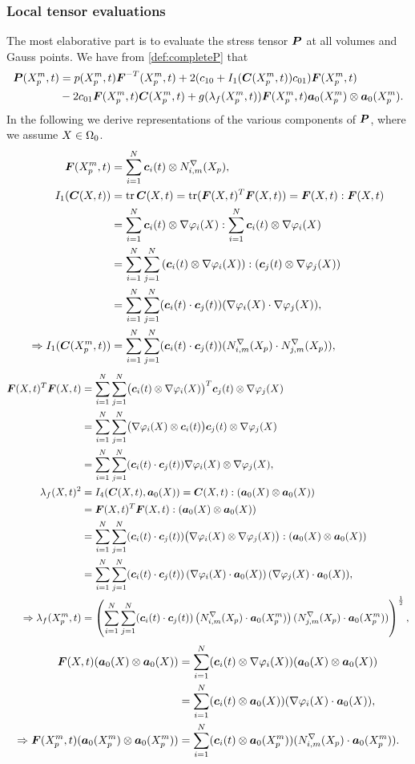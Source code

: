 \subsubsection{Local tensor evaluations}
The most elaborative part is to evaluate the stress tensor $\vP$ at all volumes and Gauss points.
We have from \eqref{def:completeP} that
\begin{align*}
		\vP(\pmp,t) &= p(\pmp,t)\vF^{-T}(\pmp,t) + 2(c_{10} + I_1(\vC(\pmp,t))c_{01})\vF(\pmp,t)\\
			 &- 2c_{01}\vF(\pmp,t)\vC(\pmp,t)+g(\lambda_f(\pmp,t))\vF(\pmp,t)\va_0(\pmp)\otimes\va_0(\pmp).
\end{align*}
In the following we derive representations of the various components of $\vP$, where we assume $X\in\Or$.
\begin{align*}
	\vF(\pmp,t) &= \sumi \vc_i(t)\otimes \dNimp,\\
	I_1(\vC(X,t)) &= \tr\vC(X,t) = \tr(\vF(X,t)^T\vF(X,t)) = \vF(X,t) : \vF(X,t)\\
	&= \sumi \vc_i(t)\otimes \dpi : \sumi \vc_i(t)\otimes \dpi\\
	&= \sumi\sumj \left(\vc_i(t)\otimes \dpi\right) : (\vc_j(t)\otimes \dpj)\\
	&= \sumi\sumj (\vc_i(t) \cdot \vc_j(t))(\dpi \cdot \dpj),\\
	\Rightarrow I_1(\vC(\pmp,t)) &= \sumi\sumj (\vc_i(t) \cdot \vc_j(t))(\dNimp \cdot \dNjmp),\\
\end{align*}
\begin{align*}
	\vF(X,t)^T\vF(X,t) &= \sumi\sumj \bigl(\vc_i(t)\otimes\dpi\bigr)^T\vc_j(t)\otimes\dpj\\
	 &= \sumi\sumj \bigl(\dpi\otimes\vc_i(t)\bigr)\vc_j(t)\otimes\dpj\\
	 &=\sumi\sumj (\vc_i(t)\cdot \vc_j(t))\dpi\otimes\dpj,\\
	\lambda_f(X,t)^2 &=I_4(\vC(X,t),\va_0(X)) = \vC(X,t):(\va_0(X)\otimes \va_0(X))\\
			&=  \vF(X,t)^T\vF(X,t) : (\va_0(X)\otimes \va_0(X))\\
			&=  \sumi\sumj (\vc_i(t)\cdot \vc_j(t))\bigl(\dpi\otimes\dpj\bigr) : (\va_0(X)\otimes \va_0(X))\\
			&=  \sumi\sumj (\vc_i(t)\cdot \vc_j(t))\left(\dpi\cdot \va_0(X)\right)(\dpj\cdot \va_0(X)),\\
	\Rightarrow \lambda_f(\pmp,t) &=
    		\left(\sumi\sumj (\vc_i(t)\cdot \vc_j(t))\left(\dNimp\cdot \va_0(\pmp)\right)(\dNjmp\cdot \va_0(\pmp))\right)^\frac{1}{2},\\
\end{align*}
\begin{align*}
    \vF(X,t)(\va_0(X)\otimes\va_0(X)) &= \sumi (\vc_i(t)\otimes \dpi)(\va_0(X)\otimes\va_0(X))\\
    &= \sumi (\vc_i(t)\otimes \va_0(X))(\dpi\cdot\va_0(X)),\\
    \Rightarrow \vF(\pmp,t)(\va_0(\pmp)\otimes\va_0(\pmp)) 
    	&= \sumi (\vc_i(t)\otimes \va_0(\pmp))(\dNimp\cdot\va_0(\pmp)).\\
\end{align*}

